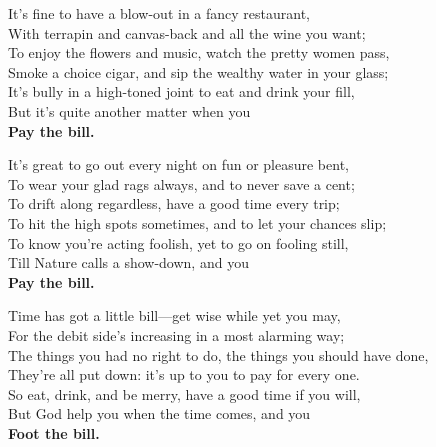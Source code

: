 
\begin{poemblock}
It's fine to have a blow-out in a fancy restaurant,\\
With terrapin and canvas-back and all the wine you want;\\
To enjoy the flowers and music, watch the pretty women pass,\\
Smoke a choice cigar, and sip the wealthy water in your glass;\\
It's bully in a high-toned joint to eat and drink your fill,\\
But it's quite another matter when you\\
\hspace*{18em}\textbf{Pay the bill.}

It's great to go out every night on fun or pleasure bent,\\
To wear your glad rags always, and to never save a cent;\\
To drift along regardless, have a good time every trip;\\
To hit the high spots sometimes, and to let your chances slip;\\
To know you're acting foolish, yet to go on fooling still,\\
Till Nature calls a show-down, and you\\
\hspace*{18em}\textbf{Pay the bill.}

Time has got a little bill—get wise while yet you may,\\
For the debit side's increasing in a most alarming way;\\
The things you had no right to do, the things you should have done,\\
They're all put down: it's up to you to pay for every one.\\
So eat, drink, and be merry, have a good time if you will,\\
But God help you when the time comes, and you\\
\hspace*{18em}\textbf{Foot the bill.}

\end{poemblock}
